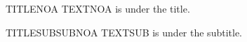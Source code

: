 \documentclass[a4paper]{memoir}
\begin{document}
\begin{frame}{TITLENOA}
  TEXTNOA is under the title.
\end{frame}
\begin{frame}{TITLESUB}{SUBNOA}
  TEXTSUB is under the subtitle.
\end{frame}
\end{document}
